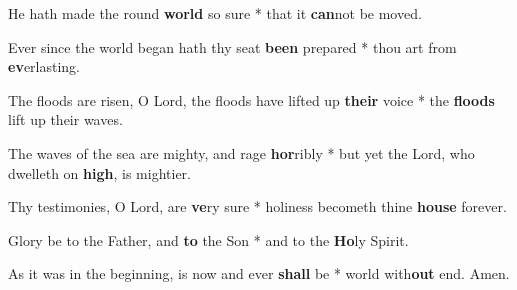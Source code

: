 \begin{multicols}{2}
	He hath made the round \textbf{world} so sure * that it \textbf{can}not be moved.
	
	Ever since the world began hath thy seat \textbf{been} prepared * thou art from \textbf{ev}erlasting.
	
	The floods are risen, O Lord, the floods have lifted up \textbf{their} voice * the \textbf{floods} lift up their waves.
	
	The waves of the sea are mighty, and rage \textbf{hor}ribly * but yet the Lord, who dwelleth on \textbf{high}, is mightier.
	
	Thy testimonies, O Lord, are \textbf{ve}ry sure * holiness becometh thine \textbf{house} forever.
	
	Glory be to the Father, and \textbf{to} the Son * and to the \textbf{Ho}ly Spirit.
	
	As it was in the beginning, is now and ever \textbf{shall} be * world with\textbf{out} end. Amen.
\end{multicols}